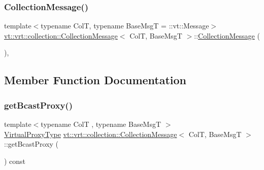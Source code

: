 \subsubsection{\texorpdfstring{Collection\+Message()}{CollectionMessage()}\hspace{0.1cm}{\footnotesize\ttfamily [2/2]}}
{\footnotesize\ttfamily template$<$typename ColT, typename Base\+MsgT = \+::vt\+::\+Message$>$ \\
\hyperlink{structvt_1_1vrt_1_1collection_1_1_collection_message}{vt\+::vrt\+::collection\+::\+Collection\+Message}$<$ ColT, Base\+MsgT $>$\+::\hyperlink{structvt_1_1vrt_1_1collection_1_1_collection_message}{Collection\+Message} (\begin{DoxyParamCaption}\item[{Col\+Msg\+Wrap\+Tag\+Type}]{ }\end{DoxyParamCaption})\hspace{0.3cm}{\ttfamily [inline]}, {\ttfamily [explicit]}}



\subsection{Member Function Documentation}
\mbox{\label{structvt_1_1vrt_1_1collection_1_1_collection_message_a25c1d0924ade6a7e074fc419a75c8a71}} 
\subsubsection{\texorpdfstring{get\+Bcast\+Proxy()}{getBcastProxy()}}
{\footnotesize\ttfamily template$<$typename ColT , typename Base\+MsgT $>$ \\
\hyperlink{namespacevt_a1b417dd5d684f045bb58a0ede70045ac}{Virtual\+Proxy\+Type} \hyperlink{structvt_1_1vrt_1_1collection_1_1_collection_message}{vt\+::vrt\+::collection\+::\+Collection\+Message}$<$ ColT, Base\+MsgT $>$\+::get\+Bcast\+Proxy (\begin{DoxyParamCaption}{ }\end{DoxyParamCaption}) const}

\mbox{\label{structvt_1_1vrt_1_1collection_1_1_collection_message_a642d64890e3ef47a5561ceaede752181}} 

